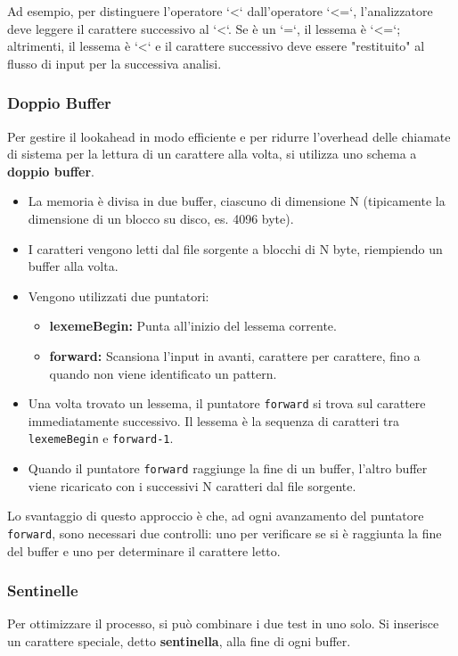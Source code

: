\documentclass[a4paper, 11pt]{article}
\begin{document}
Ad esempio, per distinguere l'operatore `<` dall'operatore `<=`, l'analizzatore deve leggere il carattere successivo al `<`. Se è un `=`, il lessema è `<=`; altrimenti, il lessema è `<` e il carattere successivo deve essere "restituito" al flusso di input per la successiva analisi.

\subsubsection{Doppio Buffer }
Per gestire il lookahead in modo efficiente e per ridurre l'overhead delle chiamate di sistema per la lettura di un carattere alla volta, si utilizza uno schema a \textbf{doppio buffer}.

\begin{itemize}
    \item La memoria è divisa in due buffer, ciascuno di dimensione N (tipicamente la dimensione di un blocco su disco, es. 4096 byte).
    \item I caratteri vengono letti dal file sorgente a blocchi di N byte, riempiendo un buffer alla volta.
    \item Vengono utilizzati due puntatori:
    \begin{itemize}
        \item \textbf{lexemeBegin:} Punta all'inizio del lessema corrente.
        \item \textbf{forward:} Scansiona l'input in avanti, carattere per carattere, fino a quando non viene identificato un pattern.
    \end{itemize}
    \item Una volta trovato un lessema, il puntatore \texttt{forward} si trova sul carattere immediatamente successivo. Il lessema è la sequenza di caratteri tra \texttt{lexemeBegin} e \texttt{forward-1}.
    \item Quando il puntatore \texttt{forward} raggiunge la fine di un buffer, l'altro buffer viene ricaricato con i successivi N caratteri dal file sorgente.
\end{itemize}

Lo svantaggio di questo approccio è che, ad ogni avanzamento del puntatore \texttt{forward}, sono necessari due controlli: uno per verificare se si è raggiunta la fine del buffer e uno per determinare il carattere letto.

\subsubsection{Sentinelle }
Per ottimizzare il processo, si può combinare i due test in uno solo. Si inserisce un carattere speciale, detto \textbf{sentinella}, alla fine di ogni buffer.
\end{document}
